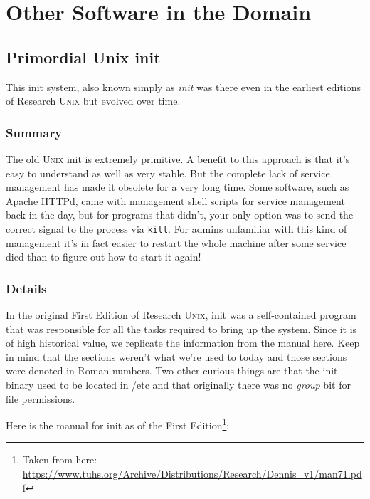 \documentclass{article}
\begin{document}
\section{Other Software in the Domain}
\subsection{Primordial Unix init}
\nocite{unix-ii}

This init system, also known simply as \textit{init} was there even in the earliest editions of Research U\textsc{nix} but evolved over time.

\subsubsection{Summary}
The old U\textsc{nix} init is extremely primitive. A benefit to this approach is that it's easy to
understand as well as very stable. But the complete lack of service management has made it obsolete for
a very long time. Some software, such as Apache HTTPd, came with management shell
scripts for service management back in the day, but for programs that didn't,
your only option was to send the correct signal to the process via \texttt{kill}. For admins unfamiliar
with this kind of management it's in fact easier to restart the whole machine after some service died
than to figure out how to start it again!

\subsubsection{Details}

In the original First Edition of Research U\textsc{nix}, init was a self-contained program that was
responsible for all the tasks required to bring up the system. Since it is of high historical value, we
replicate the information from the manual here. Keep in mind that the sections weren't what we're used
to today and those sections were denoted in Roman numbers. Two other curious things are that the init
binary used to be located in /etc and that originally there was no \textit{group} bit for file
permissions.

Here is the manual for init as of the First Edition\footnote{Taken from here: \url{https://www.tuhs.org/Archive/Distributions/Research/Dennis_v1/man71.pdf}}:\pagebreak
\end{document}
